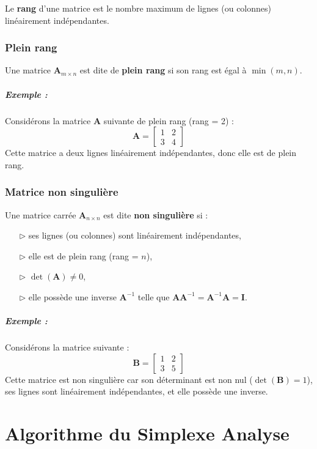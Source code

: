 \documentclass{report}
\begin{document}
\begin{multicols*}{2}
Le \textbf{rang} d'une matrice est le nombre maximum de lignes (ou colonnes) 
linéairement indépendantes.

\subsection{Plein rang}
Une matrice \(\mathbf{A}_{m \times n}\) est dite de \textbf{plein rang} si son rang 
est égal à \(\min(m, n)\).

\paragraph{Exemple :}
Considérons la matrice \(\mathbf{A}\) suivante de plein rang (rang = 2) :
\[
\mathbf{A} =
\begin{bmatrix}
1 & 2 \\
3 & 4
\end{bmatrix}
\]
Cette matrice a deux lignes linéairement indépendantes, donc elle est de plein rang.

\subsection{Matrice non singulière}
Une matrice carrée \(\mathbf{A}_{n \times n}\) est dite \textbf{non singulière} si :
\begin{itemize}
    \item[$\rhd$ ] ses lignes (ou colonnes) sont linéairement indépendantes,
    \item[$\rhd$ ] elle est de plein rang (rang = \(n\)),
    \item[$\rhd$ ] \(\det(\mathbf{A}) \neq 0\),
    \item[$\rhd$ ] elle possède une inverse \(\mathbf{A}^{-1}\) telle que 
    \(\mathbf{A} \mathbf{A}^{-1} = \mathbf{A}^{-1} \mathbf{A} = \mathbf{I}\).
\end{itemize}

\paragraph{Exemple :}
Considérons la matrice suivante :
\[
\mathbf{B} =
\begin{bmatrix}
1 & 2 \\
3 & 5
\end{bmatrix}
\]
Cette matrice est non singulière car son déterminant est non nul (\(\det(\mathbf{B}) = 1\)),
ses lignes sont linéairement indépendantes, et elle possède une inverse.

\chapter{Algorithme du Simplexe Analyse}


\end{multicols*}
\end{document}
